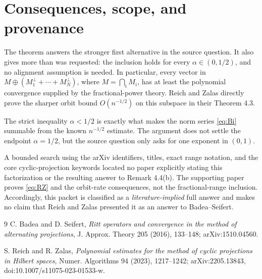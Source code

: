 \documentclass[11pt]{article}
\begin{document}
\section{Consequences, scope, and provenance}

The theorem answers the stronger first alternative in the source question.
It also gives more than was requested: the inclusion holds for every
$\alpha\in(0,1/2)$, and no alignment assumption is needed.  In particular,
every vector in
$M\oplus(M_1^\perp+\cdots+M_N^\perp)$, where
$M=\bigcap_iM_i$, has at least the polynomial convergence supplied by the
fractional-power theory.  Reich and Zalas directly prove the sharper orbit
bound $O(n^{-1/2})$ on this subspace in their Theorem 4.3.

The strict inequality $\alpha<1/2$ is exactly what makes the norm series
\eqref{eq:Bi} summable from the known $n^{-1/2}$ estimate.  The argument does
not settle the endpoint $\alpha=1/2$, but the source question only asks for
one exponent in $(0,1)$.

A bounded search using the arXiv identifiers, titles, exact range notation,
and the core cyclic-projection keywords located no paper explicitly stating
this factorization or the resulting answer to Remark 4.4(b).  The supporting
paper proves \eqref{eq:RZ} and the orbit-rate consequences, not the
fractional-range inclusion.  Accordingly, this packet is classified as a
\emph{literature-implied} full answer and makes no claim that Reich and Zalas
presented it as an answer to Badea--Seifert.

\begingroup\raggedright
\begin{thebibliography}{9}
C. Badea and D. Seifert,
\emph{Ritt operators and convergence in the method of alternating
projections}, J. Approx. Theory 205 (2016), 133--148;
arXiv:1510.04560.

S. Reich and R. Zalas,
\emph{Polynomial estimates for the method of cyclic projections in Hilbert
spaces}, Numer. Algorithms 94 (2023), 1217--1242;
arXiv:2205.13843, doi:10.1007/s11075-023-01533-w.
\end{thebibliography}
\endgroup
\end{document}
